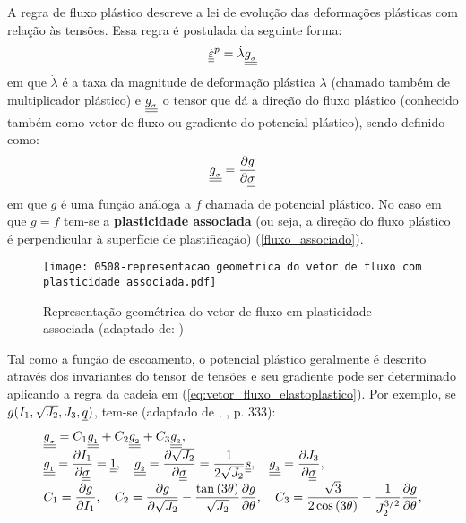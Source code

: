 A regra de fluxo plástico descreve a lei de evolução das deformações plásticas com relação às tensões. Essa regra é postulada da seguinte forma:
\begin{equation}
	\label{eq:fluxo_elastoplastico}
	\dot {\underline{\underline \varepsilon}}^p = \dot \lambda \underline{\underline {g_{_\sigma}}}
\end{equation}
em que $\dot \lambda$ é a taxa da magnitude de deformação plástica $\lambda$ (chamado também de multiplicador plástico) e $\underline{\underline {g_{_\sigma}}}$ o tensor que dá a direção do fluxo plástico (conhecido também como vetor de fluxo ou gradiente do potencial plástico), sendo definido como:
\begin{equation}
	\label{eq:vetor_fluxo_elastoplastico}
	\underline{\underline {g_{_\sigma}}} = \dfrac{\partial g}{\partial \underline{\underline \sigma}}
\end{equation}
em que $g$ é uma função análoga a $f$ chamada de potencial plástico. No caso em que $g=f$ tem-se a \textbf{plasticidade associada} (ou seja, a direção do fluxo plástico é perpendicular à superfície de plastificação) (\autoref{fluxo_associado}).
\begin{figure}[H]
	\begin{center}
		\texttt{[image: 0508-representacao geometrica do vetor de fluxo com plasticidade associada.pdf]}
	\end{center}
	\caption{\label{fluxo_associado}Representação geométrica do vetor de fluxo em plasticidade associada (adaptado de: )}
\end{figure}
Tal como a função de escoamento, o potencial plástico geralmente é descrito através dos invariantes do tensor de tensões e seu gradiente pode ser determinado aplicando a regra da cadeia em (\ref{eq:vetor_fluxo_elastoplastico}). Por exemplo, se $g(I_1,\sqrt{J_2},J_3,\underline q)$, tem-se (adaptado de \citeauthor{Viladkar1995}, \citeyear{Viladkar1995}, p. 333):
\begin{equation}
	\label{eq:invariantes_tensores}
	\begin{array}{lcl}
		\underline{\underline {g_{_\sigma}}} = C_1\underline{\underline {g_{_1}}} + C_2\underline{\underline {g_{_2}}} + C_3\underline{\underline {g_{_3}}}, \\ 
		\underline{\underline {g_{_1}}} = \dfrac{\partial I_1}{\partial \underline{\underline \sigma}} = \underline{\underline 1},~~~ \underline{\underline {g_{_2}}} = \dfrac{\partial \sqrt{J_2}}{\partial \underline{\underline \sigma}} = \dfrac{1}{2\sqrt{J_2}}\underline{\underline s},~~~ \underline{\underline {g_{_3}}} = \dfrac{\partial J_3}{\partial \underline{\underline \sigma}}, \\
		C_1 = \dfrac{\partial g}{\partial I_1},~~~C_2=\dfrac{\partial g}{\partial \sqrt{J_2}}-\dfrac{\tan{(3\theta)}}{\sqrt{J_2}}\dfrac{\partial g}{\partial \theta},~~~C_3 = \dfrac{\sqrt{3}}{2\cos{(3\theta})}-\dfrac{1}{J_2^{3/2}}\dfrac{\partial g}{\partial \theta},
	\end{array}
\end{equation}
